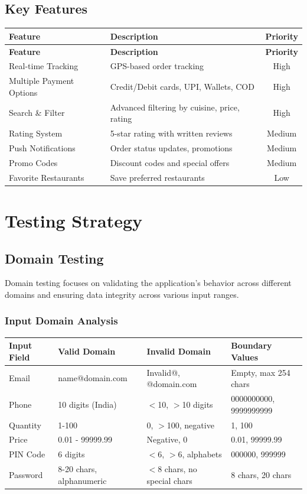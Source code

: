 \documentclass[12pt,a4paper]{report}
\begin{document}
\section{Key Features}

\begin{longtable}{|p{4cm}|p{7cm}|c|}
\hline
\textbf{Feature} & \textbf{Description} & \textbf{Priority} \\
\hline
\endfirsthead
\hline
\textbf{Feature} & \textbf{Description} & \textbf{Priority} \\
\hline
\endhead
Real-time Tracking & GPS-based order tracking & High \\
\hline
Multiple Payment Options & Credit/Debit cards, UPI, Wallets, COD & High \\
\hline
Search \& Filter & Advanced filtering by cuisine, price, rating & High \\
\hline
Rating System & 5-star rating with written reviews & Medium \\
\hline
Push Notifications & Order status updates, promotions & Medium \\
\hline
Promo Codes & Discount codes and special offers & Medium \\
\hline
Favorite Restaurants & Save preferred restaurants & Low \\
\hline
\end{longtable}

\chapter{Testing Strategy}

\section{Domain Testing}
Domain testing focuses on validating the application's behavior across different domains and ensuring data integrity across various input ranges.

\subsection{Input Domain Analysis}

\begin{longtable}{|p{2.5cm}|p{3.5cm}|p{3.5cm}|p{3.5cm}|}
\hline
\textbf{Input Field} & \textbf{Valid Domain} & \textbf{Invalid Domain} & \textbf{Boundary Values} \\
\hline
\endfirsthead
Email & name@domain.com & Invalid@, @domain.com & Empty, max 254 chars \\
\hline
Phone & 10 digits (India) & $<$10, $>$10 digits & 0000000000, 9999999999 \\
\hline
Quantity & 1-100 & 0, $>$100, negative & 1, 100 \\
\hline
Price & 0.01 - 99999.99 & Negative, 0 & 0.01, 99999.99 \\
\hline
PIN Code & 6 digits & $<$6, $>$6, alphabets & 000000, 999999 \\
\hline
Password & 8-20 chars, alphanumeric & $<$8 chars, no special chars & 8 chars, 20 chars \\
\hline
\end{longtable}
\end{document}
